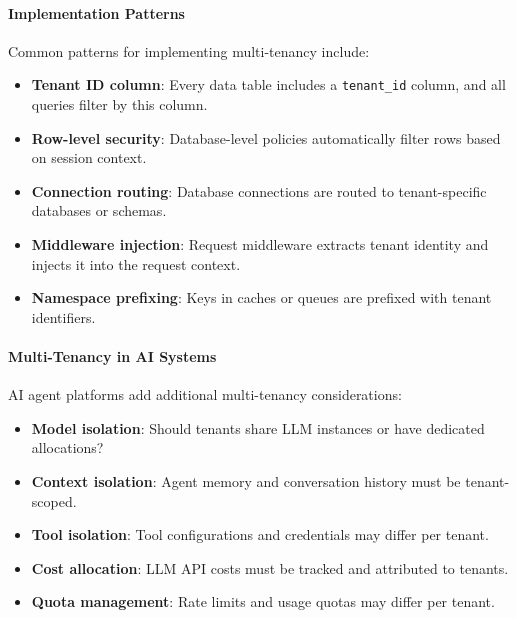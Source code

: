 \documentclass[a4paper,twoside]{sapthesis}
\begin{document}
\paragraph{Implementation Patterns}

Common patterns for implementing multi-tenancy include:

\begin{itemize}
    \item \textbf{Tenant ID column}: Every data table includes a \texttt{tenant\_id} column, and all queries filter by this column.
    
    \item \textbf{Row-level security}: Database-level policies automatically filter rows based on session context.
    
    \item \textbf{Connection routing}: Database connections are routed to tenant-specific databases or schemas.
    
    \item \textbf{Middleware injection}: Request middleware extracts tenant identity and injects it into the request context.
    
    \item \textbf{Namespace prefixing}: Keys in caches or queues are prefixed with tenant identifiers.
\end{itemize}

\paragraph{Multi-Tenancy in AI Systems}

AI agent platforms add additional multi-tenancy considerations:

\begin{itemize}
    \item \textbf{Model isolation}: Should tenants share LLM instances or have dedicated allocations?
    \item \textbf{Context isolation}: Agent memory and conversation history must be tenant-scoped.
    \item \textbf{Tool isolation}: Tool configurations and credentials may differ per tenant.
    \item \textbf{Cost allocation}: LLM API costs must be tracked and attributed to tenants.
    \item \textbf{Quota management}: Rate limits and usage quotas may differ per tenant.
\end{itemize}
\end{document}
